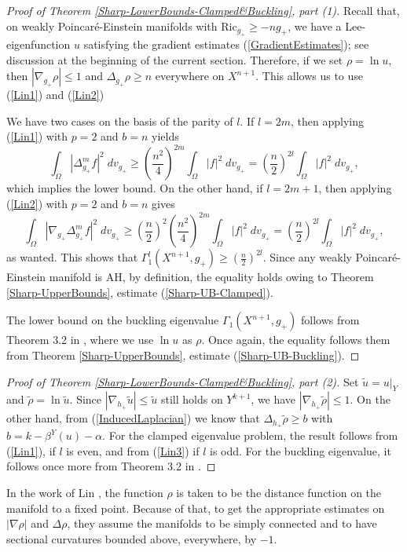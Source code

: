 \documentclass{amsart}
\newcommand{\Ric}{\text{Ric}}
\begin{document}
\begin{proof}[Proof of Theorem \ref{Sharp-LowerBounds-Clamped&Buckling}, part (1)]
    Recall that, on weakly Poincar\'e-Einstein manifolds with $\Ric_{g_+}\ge -ng_+$, we have a Lee-eigenfunction $u$ satisfying the gradient estimates (\ref{GradientEstimates}); see discussion at the beginning of the current section. Therefore, if we set $\rho = \ln u$, then $|\nabla_{g_+}\rho|\le 1$ and $\Delta_{g_+}\rho\ge n$ everywhere on $X^{n+1}$. This allows us to use (\ref{Lin1}) and (\ref{Lin2})

    We have two cases on the basis of the parity of $l$. If $l=2m$, then applying (\ref{Lin1}) with $p=2$ and $b=n$ yields
    \[
    \int_{\Omega}|\Delta_{g_+}^mf|^2\;dv_{g_+}\ge \left(\frac{n^2}{4}\right)^{2m}\int_{\Omega}|f|^2\;dv_{g_+} = \left(\frac{n}{2}\right)^{2l}\int_\Omega |f|^2\;dv_{g_+},
    \]
    which implies the lower bound. On the other hand, if $l=2m+1$, then applying (\ref{Lin2}) with $p=2$ and $b=n$ gives
    \[
    \int_\Omega |\nabla_{g_+}\Delta^m_{g_+}f|^2\;dv_{g_+} \ge \left(\frac{n}{2}\right)^2\left(\frac{n^2}{4}\right)^{2m} \int_\Omega |f|^2\;dv_{g_+} = \left(\frac{n}{2}\right)^{2l}\int_\Omega |f|^2\;dv_{g_+},
    \]
    as wanted. This shows that $\Gamma^l_1(X^{n+1},g_+)\ge \left(\frac{n}{2}\right)^{2l}$. Since any weakly Poincar\'e-Einstein manifold is AH, by definition, the equality holds owing to Theorem \ref{Sharp-UpperBounds}, estimate (\ref{Sharp-UB-Clamped}).

    The lower bound on the buckling eigenvalue $\Gamma_1(X^{n+1},g_+)$ follows from Theorem 3.2 in \cite{LinHezi2025Sgef}, where we use $\ln u$ as $\rho$. Once again, the equality follows them from Theorem \ref{Sharp-UpperBounds}, estimate (\ref{Sharp-UB-Buckling}).
\end{proof}

\begin{proof}[Proof of Theorem \ref{Sharp-LowerBounds-Clamped&Buckling}, part (2)] Set $\tilde u = u|_{Y}$ and $\tilde \rho = \ln \tilde u$. Since $|\nabla_{h_+}\tilde u|\le \tilde u$ still holds on $Y^{k+1}$, we have $|\nabla_{h_+}\tilde \rho|\le 1$. On the other hand, from (\ref{InducedLaplacian}) we know that $\Delta_{h_+}\tilde \rho \ge b$ with $b=k-\beta^Y(u)-\alpha$. For the clamped eigenvalue problem, the result follows from (\ref{Lin1}), if $l$ is even, and from (\ref{Lin3}) if $l$ is odd. For the buckling eigenvalue, it follows once more from Theorem 3.2 in \cite{LinHezi2025Sgef}.
\end{proof}

\begin{remark}
    In the work of Lin \cite{LinHezi2025Sgef}, the function $\rho$ is taken to be the distance function on the manifold to a fixed point. Because of that, to get the appropriate estimates on $|\nabla \rho|$ and $\Delta \rho$, they assume the manifolds to be simply connected and to have sectional curvatures bounded above, everywhere, by $-1$.
\end{remark}






\end{document}
